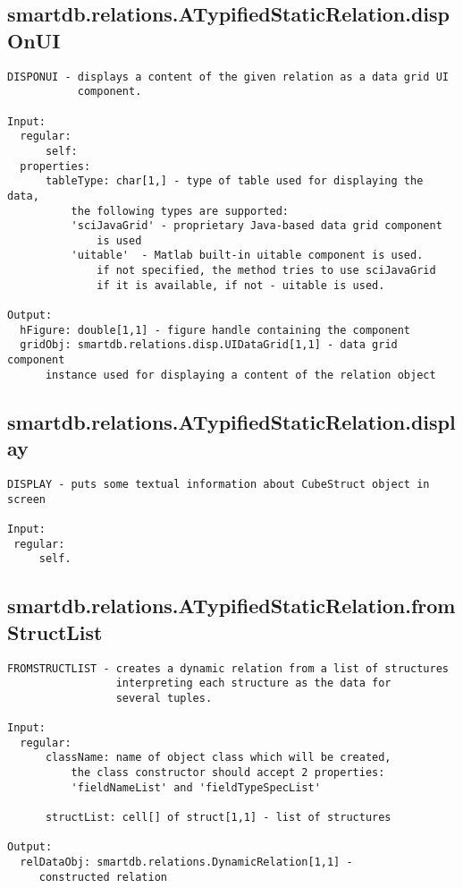 \subsection{\texorpdfstring{smartdb.relations.ATypifiedStaticRelation.dispOnUI}{dispOnUI}}\label{method:smartdb.relations.ATypifiedStaticRelation.dispOnUI}
\begin{verbatim}
DISPONUI - displays a content of the given relation as a data grid UI
           component.

Input:
  regular:
      self:
  properties:
      tableType: char[1,] - type of table used for displaying the data,
          the following types are supported:
          'sciJavaGrid' - proprietary Java-based data grid component
              is used
          'uitable'  - Matlab built-in uitable component is used.
              if not specified, the method tries to use sciJavaGrid
              if it is available, if not - uitable is used.

Output:
  hFigure: double[1,1] - figure handle containing the component
  gridObj: smartdb.relations.disp.UIDataGrid[1,1] - data grid component
      instance used for displaying a content of the relation object
\end{verbatim}
\subsection{\texorpdfstring{smartdb.relations.ATypifiedStaticRelation.display}{display}}\label{method:smartdb.relations.ATypifiedStaticRelation.display}
\begin{verbatim}
DISPLAY - puts some textual information about CubeStruct object in screen

Input:
 regular:
     self.
\end{verbatim}
\subsection{\texorpdfstring{smartdb.relations.ATypifiedStaticRelation.fromStructList}{fromStructList}}\label{method:smartdb.relations.ATypifiedStaticRelation.fromStructList}
\begin{verbatim}
FROMSTRUCTLIST - creates a dynamic relation from a list of structures
                 interpreting each structure as the data for
                 several tuples.

Input:
  regular:
      className: name of object class which will be created,
          the class constructor should accept 2 properties:
          'fieldNameList' and 'fieldTypeSpecList'

      structList: cell[] of struct[1,1] - list of structures

Output:
  relDataObj: smartdb.relations.DynamicRelation[1,1] -
     constructed relation
\end{verbatim}

